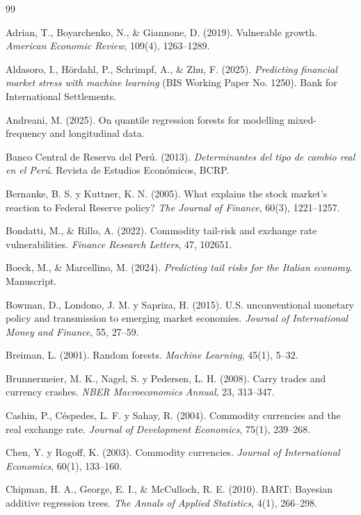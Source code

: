 ﻿\documentclass[11pt,a4paper]{article}
\begin{document}
\begin{thebibliography}{99}

Adrian, T., Boyarchenko, N., \& Giannone, D. (2019). Vulnerable growth. \textit{American Economic Review}, 109(4), 1263--1289.

Aldasoro, I., Hördahl, P., Schrimpf, A., \& Zhu, F. (2025). \textit{Predicting financial market stress with machine learning} (BIS Working Paper No. 1250). Bank for International Settlements.

Andreani, M. (2025). On quantile regression forests for modelling mixed-frequency and longitudinal data. %

Banco Central de Reserva del Perú. (2013). \textit{Determinantes del tipo de cambio real en el Perú}. Revista de Estudios Económicos, BCRP.

Bernanke, B. S. y Kuttner, K. N. (2005). What explains the stock market's reaction to Federal Reserve policy? \textit{The Journal of Finance}, 60(3), 1221--1257.

Bondatti, M., \& Rillo, A. (2022). Commodity tail-risk and exchange rate vulnerabilities. \textit{Finance Research Letters}, 47, 102651.

Boeck, M., \& Marcellino, M. (2024). \textit{Predicting tail risks for the Italian economy}. Manuscript.

Bowman, D., Londono, J. M. y Sapriza, H. (2015). U.S. unconventional monetary policy and transmission to emerging market economies. \textit{Journal of International Money and Finance}, 55, 27--59.

Breiman, L. (2001). Random forests. \textit{Machine Learning}, 45(1), 5--32.

Brunnermeier, M. K., Nagel, S. y Pedersen, L. H. (2008). Carry trades and currency crashes. \textit{NBER Macroeconomics Annual}, 23, 313--347.

Cashin, P., Céspedes, L. F. y Sahay, R. (2004). Commodity currencies and the real exchange rate. \textit{Journal of Development Economics}, 75(1), 239--268.

Chen, Y. y Rogoff, K. (2003). Commodity currencies. \textit{Journal of International Economics}, 60(1), 133--160.

Chipman, H. A., George, E. I., \& McCulloch, R. E. (2010). BART: Bayesian additive regression trees. \textit{The Annals of Applied Statistics}, 4(1), 266--298.


\end{thebibliography}
\end{document}
